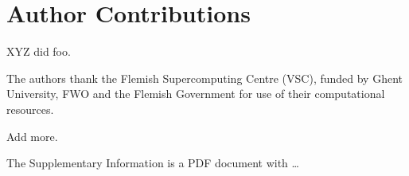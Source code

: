 \documentclass[journal=jctcce,manuscript=article,layout=traditional]{achemso}
\begin{document}
    \section*{Author Contributions}
    \label{sec:author-contributions}

    XYZ did foo.

    \begin{acknowledgement}
    The authors thank the Flemish Supercomputing Centre (VSC),
    funded by Ghent University,
    FWO and the Flemish Government for use of their computational resources.

    Add more.
    \end{acknowledgement}

    \begin{suppinfo}
    The Supplementary Information is a PDF document with \ldots
    \end{suppinfo}

    
\end{document}
